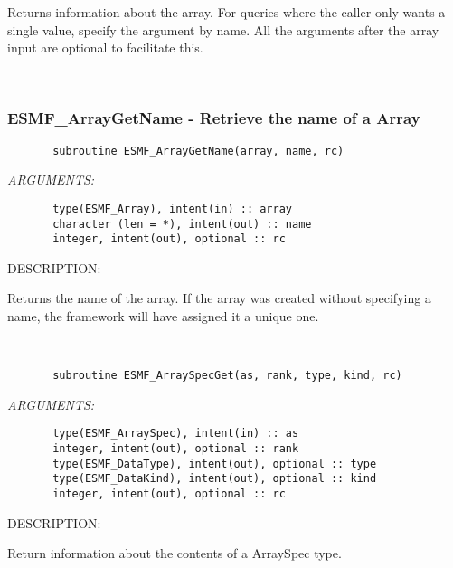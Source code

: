    Returns information about the array. For queries where the caller
   only wants a single value, specify the argument by name.
   All the arguments after the array input are optional to facilitate this.
   
 
\mbox{}\hrulefill\ 
 
\subsubsection [ESMF\_ArrayGetName] {ESMF\_ArrayGetName - Retrieve the name of a Array}


  
\begin{verbatim}       subroutine ESMF_ArrayGetName(array, name, rc)\end{verbatim}{\em ARGUMENTS:}
\begin{verbatim}       type(ESMF_Array), intent(in) :: array
       character (len = *), intent(out) :: name
       integer, intent(out), optional :: rc\end{verbatim}
{\sf DESCRIPTION:\\ }


   Returns the name of the array. If the array was created without
   specifying a name, the framework will have assigned it a unique one.
   
 
\mbox{}\hrulefill\ 
 

\begin{verbatim}       subroutine ESMF_ArraySpecGet(as, rank, type, kind, rc)\end{verbatim}{\em ARGUMENTS:}
\begin{verbatim}       type(ESMF_ArraySpec), intent(in) :: as
       integer, intent(out), optional :: rank
       type(ESMF_DataType), intent(out), optional :: type
       type(ESMF_DataKind), intent(out), optional :: kind
       integer, intent(out), optional :: rc\end{verbatim}
{\sf DESCRIPTION:\\ }


   Return information about the contents of a ArraySpec type.
  
